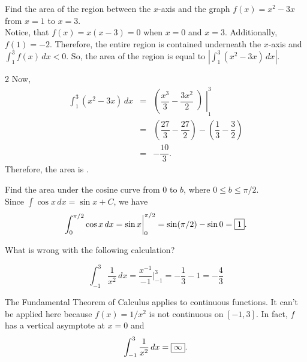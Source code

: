 \documentclass{book}
\newcommand{\dx}{\,dx}
\newcommand{\dint}{\displaystyle \int}
\newcommand{\bvert}{\bigg\vert}
\begin{document}
\begin{Exam} Find the area of the region between the $x$-axis and the graph $f(x) = x^2- 3x$ from $x=1$ to $x=3$.\\

Notice, that $f(x)= x(x-3) = 0$ when $x=0$ and $x=3$.  Additionally, $f(1) = -2$. Therefore, the entire region is contained underneath the $x$-axis and $\dint_1^3 f(x)\dx < 0$. So, the area of the region is equal to $\left|\dint_1^3 (x^2-3x)\dx\right|$. 
\begin{multicols}{2}
Now, 
\begin{eqnarray*}
\int_1^3 (x^2-3x)\dx &=& \left(\dfrac{x^3}{3}- \dfrac{3x^2}{2}\middle)\right|_1^3\\
 &=& \left(\dfrac{27}{3} - \dfrac{27}{2}\right) - \left(\dfrac{1}{3} - \dfrac{3}{2}\right)\\
 &=& -\dfrac{10}{3}.
\end{eqnarray*} Therefore, the area is .\\

\begin{center}
\end{center}
\end{multicols}
\end{Exam}\vs

\begin{Exam} Find the area under the cosine curve from $0$ to $b$, where $0\le b\le \pi/2$.\\

Since $\dint \cos x\dx = \sin x +C$, we have
\[\int_0^{\pi/2} \cos x\dx = \sin x\bigg\vert_0^{\pi/2} = \sin(\pi/2) - \sin 0 = \fbox{1}. \]
\end{Exam}\vs

\begin{Exam} What is wrong with the following calculation?

\[\int_{-1}^3 \dfrac{1}{x^2}\dx = \dfrac{x^{-1}}{-1}\bvert_{-1}^3  = -\dfrac{1}{3} - 1 = -\dfrac{4}{3}\]

The Fundamental Theorem of Calculus applies to continuous functions. It can't be applied here because $f(x) = 1/x^2$ is not continuous on $[-1,3]$. In fact, $f$ has a vertical asymptote at $x=0$ and \[\int_{-1}^3 \dfrac{1}{x^2}\dx = \fbox{$\infty$}. \]
\end{Exam}
\end{document}
